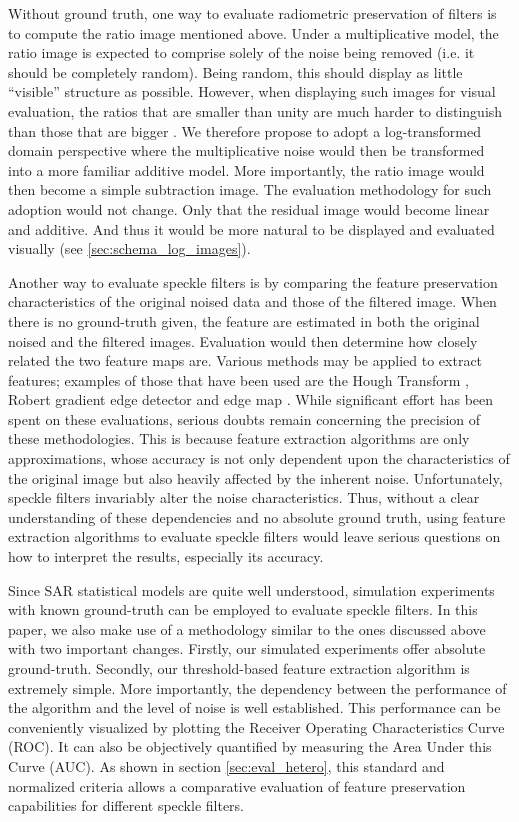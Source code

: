\documentclass[journal]{IEEEtran}
\begin{document}
Without ground truth, one way to evaluate radiometric preservation of filters is to compute the ratio image mentioned above. 
Under a multiplicative model, the ratio image is expected to comprise solely of
    the noise being removed (i.e. it should be completely random). 
Being random, this should display as little ``visible'' structure as possible. 
However, when displaying such images for visual evaluation, the ratios that are smaller than unity are much 
harder to distinguish than those that are bigger \cite{Medeiros_2003_IJRS}. 
We therefore propose to adopt a log-transformed domain perspective 
  where the multiplicative noise would then be transformed into a more familiar additive model.
More importantly, the ratio image would then become a simple subtraction image.
The evaluation methodology for such adoption would not change. 
Only that the residual image would become linear and additive.
And thus it would be more natural to be displayed and evaluated visually (see \ref{sec:schema_log_images}).

Another way to evaluate speckle filters is by comparing the feature preservation characteristics 
of the original noised data and those of the filtered image. 
When there is no ground-truth given, the feature are estimated in both the original noised and the filtered images.
Evaluation would then determine how closely related the two feature maps are. 
Various methods may be applied to extract features; examples of those that have been used are the 
	Hough Transform \cite{Medeiros_2003_IJRS}, Robert gradient edge detector \cite{Gagnon_SPIEProc_1997} 
	and edge map \cite{Frost_PAMI_1982}.
While significant effort has been spent on these evaluations, serious doubts remain concerning the precision 
of these methodologies.
This is because feature extraction algorithms are only approximations,
	whose accuracy is not only dependent upon the characteristics of the original image 
		but also heavily affected by 
		the inherent noise.
Unfortunately, speckle filters invariably alter the noise characteristics.
Thus, without a clear understanding of these dependencies and no absolute ground truth, 
	using feature extraction algorithms to evaluate speckle filters would leave serious questions on 
	how to interpret the results, especially its accuracy.

Since SAR statistical models are quite well understood, 
	simulation experiments with known ground-truth can be employed 
		to evaluate speckle filters.
In this paper, we also make use of a methodology similar to the ones discussed above with two important changes.
Firstly, our simulated experiments offer absolute ground-truth.
Secondly, our threshold-based feature extraction algorithm is extremely simple.
More importantly, the dependency between the performance of the algorithm and the level of noise is well established. 
This performance can be 
	conveniently visualized by plotting the Receiver Operating Characteristics Curve (ROC).   
It can also be objectively quantified by measuring the Area Under this Curve (AUC). 
As shown in section \ref{sec:eval_hetero}, this standard and normalized criteria allows a comparative evaluation of 
	feature preservation capabilities for different speckle filters.
\end{document}

